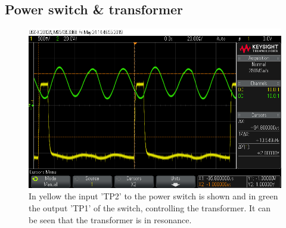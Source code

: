 \subsection{Power switch \& transformer}


\begin{figure}[H]
\centering
\includegraphics[width=.9\textwidth]{figures/scope_19.png}
\caption{In yellow the input 'TP2' to the power switch is shown and in green the output 'TP1' of the switch, controlling the transformer. It can be seen that the transformer is in resonance.}
\label{fig:scope_19}
\end{figure}



